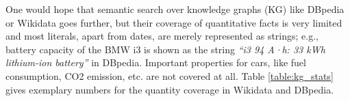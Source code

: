 One would hope that semantic search over knowledge
graphs (KG) like DBpedia
 or Wikidata goes further,
but their coverage of quantitative facts is very limited
and most literals, apart from dates, are merely represented as strings; e.g., battery capacity of the BMW i3 is shown as the string
\textit{``i3 94 A·h: 33 kWh lithium-ion battery''} in DBpedia.
Important properties for cars, like fuel consumption, CO2 emission, etc. are not covered at all.
 Table \ref{table:kg_stats} gives exemplary numbers for the quantity coverage in Wikidata and DBpedia.



